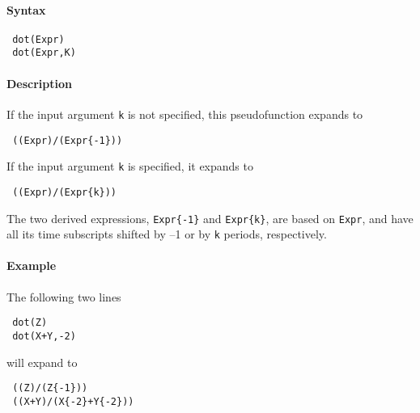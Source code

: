 


	\paragraph{Syntax}
 
 \begin{verbatim}
 dot(Expr)
 dot(Expr,K)
 \end{verbatim}
 
 \paragraph{Description}
 
 If the input argument \texttt{k} is not specified, this pseudofunction
 expands to
 
 \begin{verbatim}
 ((Expr)/(Expr{-1}))
 \end{verbatim}
 
 If the input argument \texttt{k} is specified, it expands to
 
 \begin{verbatim}
 ((Expr)/(Expr{k}))
 \end{verbatim}
 
 The two derived expressions, \texttt{Expr\{-1\}} and \texttt{Expr\{k\}},
 are based on \texttt{Expr}, and have all its time subscripts shifted by
 --1 or by \texttt{k} periods, respectively.
 
 \paragraph{Example}
 
 The following two lines
 
 \begin{verbatim}
 dot(Z)
 dot(X+Y,-2)
 \end{verbatim}
 
 will expand to
 
 \begin{verbatim}
 ((Z)/(Z{-1}))
 ((X+Y)/(X{-2}+Y{-2}))
 \end{verbatim}


